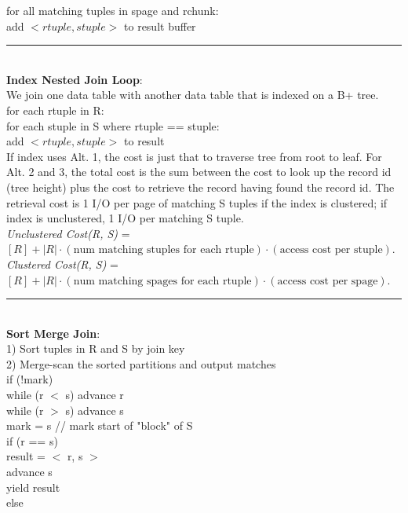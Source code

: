 \documentclass[10pt,landscape]{article}
\newcommand{\ruler}{\\\rule{\columnwidth}{0.25pt}\\}
\begin{document}
\begin{multicols*}{3}
\-\hspace{1.0cm} for all matching tuples in spage and rchunk:\\
\-\hspace{1.5cm} add $<rtuple, stuple>$ to result buffer
\ruler
\textbf{Index Nested Join Loop}:\\
We join one data table with another data table that is indexed on a B+ tree.\\
for each rtuple in R:\\
\-\hspace{0.5cm} for each stuple in S where rtuple == stuple:\\
\-\hspace{1.0cm} add $<rtuple, stuple>$ to result\\
If index uses Alt. 1, the  cost is just that to traverse tree from root to leaf. For Alt. 2 and 3, the total cost is the sum between the cost to look up the record id (tree height) plus the cost to retrieve the record having found the record id. The retrieval cost is 1 I/O per page of matching S tuples if the index is clustered; if index is unclustered, 1 I/O per matching S tuple. \\
\textit{Unclustered Cost(R, S)} = $[R] + |R| \cdot (\text{num matching stuples for each rtuple}) \cdot (\text{access cost per stuple})$.
\textit{Clustered Cost(R, S)} = $[R] + |R| \cdot (\text{num matching spages for each rtuple}) \cdot (\text{access cost per spage})$.
\ruler
\textbf{Sort Merge Join}:\\
1) Sort tuples in R and S by join key\\
2) Merge-scan the sorted partitions and output matches\\
if (!mark)\\
\-\hspace{0.5cm} while (r $<$ s) advance r \\
\-\hspace{0.5cm} while (r $>$ s) advance s \\
\-\hspace{0.5cm} mark = s // mark start of "block" of S \\
if (r == s) \\
\-\hspace{0.5cm} result = $<$ r, s $>$\\
\-\hspace{0.5cm} advance s\\
\-\hspace{0.5cm} yield result\\
else\\

\end{multicols*}
\end{document}
